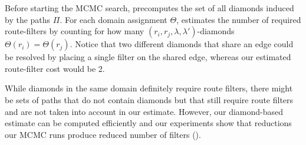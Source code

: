 Before  starting the MCMC search, \name precomputes
the set of all diamonds induced by the paths $\Pi$. 
For each
domain assignment $\Theta$,
\name estimates the number  of required route-filters by counting for how many $(r_i, r_j, \lambda, \lambda')$-diamonds
$\Theta(r_i) = \Theta(r_j)$. 
Notice that two different diamonds that share an edge could be resolved
by placing a single filter on the shared edge, whereas our estimated route-filter cost 
would be 2. 

While diamonds in the same domain definitely require route filters, there might be
sets of paths that do not contain diamonds but that still require route filters
and are not
taken into account in our estimate. 
However, our diamond-based estimate
can be computed efficiently and 
our experiments show that reductions our MCMC runs 
produce reduced number of filters (). 


